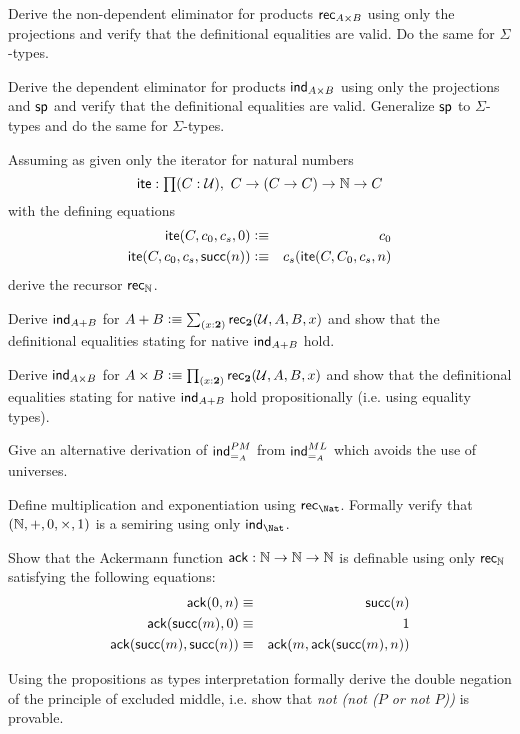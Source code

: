 \begin{ex}
Derive the non-dependent eliminator for products $\mathsf{rec}_{A\times B} $ using only the projections and verify that the definitional equalities are valid. Do the same for $\Sigma$-types.
\end{ex}
\begin{ex}
Derive the dependent eliminator for products $\mathsf{ind}_{A\times B}$ using only the projections and $\mathsf{sp}$ and verify that the definitional equalities are valid. Generalize $\mathsf{sp}$ to $\Sigma$-types and do the same for $\Sigma$-types.
\end{ex}
\begin{ex}
Assuming as given only the iterator for natural numbers
\[\ite : \prd{C:\UU} C \to (C \to C) \to \nat \to C \]
with the defining equations
\begin{eqnarray*}
\mathsf{ite}(C,c_0,c_s,0)  & \vcentcolon\equiv & c_0 \\
\mathsf{ite}(C,c_0,c_s,\mathsf{succ}(n)) & \vcentcolon\equiv & c_s(\mathsf{ite}(C,C_0,c_s,n)  
\end{eqnarray*}
derive the recursor $\mathsf{rec}_{\mathbb{N}}$.
\end{ex}
\begin{ex}
Derive $\mathsf{ind}_{A+B}$ for  $A + B \defeq \sm{x:\bool} \rec{\bool}(\UU,A,B,x)$ and show that the definitional equalities stating for native $\mathsf{ind}_{A+B}$ hold.
\end{ex}
\begin{ex}
Derive $\mathsf{ind}_{A\times B}$ for  $A \times B \defeq \prd{x:\bool}\rec{\bool}(\UU,A,B,x)$ and show that the definitional equalities stating for native $\mathsf{ind}_{A+B}$ hold propositionally (i.e. using equality types).
\end{ex}
\begin{ex}
Give an alternative derivation of $\mathsf{ind}_{=_A}^{PM}$ from $\mathsf{ind}_{=_A}^{ML}$ which avoids the use of universes.
\end{ex}
\begin{ex}
Define multiplication and exponentiation using $\rec{\Nat}$. Formally verify that $(\mathbb{N},+,0,\times,1)$ is a semiring using only $\ind{\Nat}$.  
\end{ex}
\begin{ex}
  Show that the Ackermann function $\mathsf{ack} : \mathbb{N} \to \mathbb{N} \to \mathbb{N}$ is definable using only $\mathsf{rec}_{\mathbb{N}}$ satisfying the following equations:
  \begin{eqnarray*}
    \mathsf{ack}(0,n) & \equiv & \mathsf{succ}(n) \\
    \mathsf{ack}(\mathsf{succ}(m),0) & \equiv & 1 \\
    \mathsf{ack}(\mathsf{succ}(m),\mathsf{succ}(n)) & \equiv & \mathsf{ack}(m,\mathsf{ack}(\mathsf{succ}(m),n))
  \end{eqnarray*}
\end{ex}
\begin{ex}
Using the propositions as types interpretation formally derive the double negation of the principle of excluded middle, i.e. show 
that \emph{not (not ($P$ or not $P$))}  is provable.
\end{ex}
